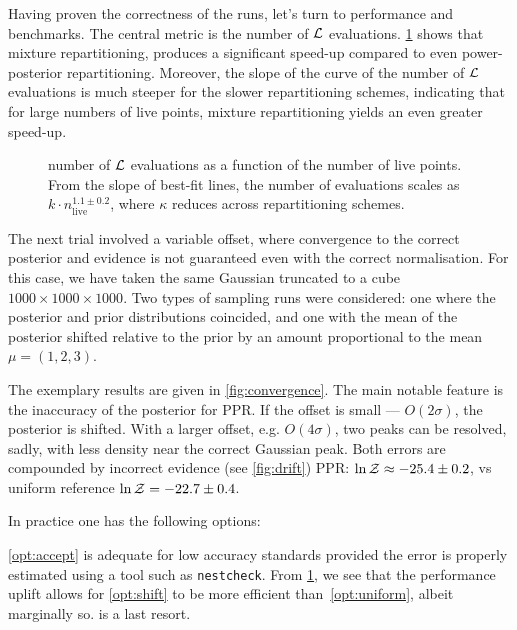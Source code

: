\documentclass[usenatbib]{mnras}
\begin{document}
Having proven the correctness of the runs, let's turn to performance
and benchmarks. The central metric is the number of \({\cal L}\)
evaluations. \cref{fig:benchmark} shows that mixture
repartitioning, produces a significant speed-up compared to even
power-posterior repartitioning. Moreover, the slope of the curve of
the number of \({\cal L}\) evaluations is much steeper for the
slower repartitioning schemes, indicating that for large numbers of
live points, mixture repartitioning yields an even greater
speed-up.



\begin{figure}
  
  \caption{number of ${\cal L}$ evaluations as a function of the
    number of live points. From the slope of best-fit lines, the
    number of evaluations scales as $k\cdot n_\text{live}^{1.1 \pm 0.2}$,
    where $\kappa$ reduces across repartitioning
    schemes. \label{fig:benchmark}}
\end{figure}


The next trial involved a variable offset, where convergence to the
correct posterior and evidence is not guaranteed even with the correct
normalisation. For this case, we have taken the same Gaussian
truncated to a cube \(1000\times1000\times1000\). Two types of
sampling runs were considered: one where the posterior and prior
distributions coincided, and one with the mean of the posterior
shifted relative to the prior by an amount proportional to the mean
$\mu = (1,2,3)$.

The exemplary results are given in \cref{fig:convergence}. The main
notable feature is the inaccuracy of the posterior for PPR. If the
offset is small --- \(O(2\sigma)\), the posterior is shifted. With a
larger offset, e.g. \(O(4\sigma)\), two peaks can be resolved, sadly,
with less density near the correct Gaussian peak. Both errors are
compounded by incorrect evidence (see \cref{fig:drift}) PPR:
\(\ln {\cal Z}\approx -25.4 \pm 0.2\), vs uniform reference
\(\ln {\cal Z} = -22.7 \pm 0.4\).

In practice one has the following options:
\vref{opt:accept} is adequate for low accuracy standards provided the
error is properly estimated using a tool such as \texttt{nestcheck}.
From \cref{fig:benchmark}, we see that the performance uplift allows
for \cref{opt:shift} to be more efficient than~\ref{opt:uniform},
albeit marginally so.  is a last resort.
\end{document}
